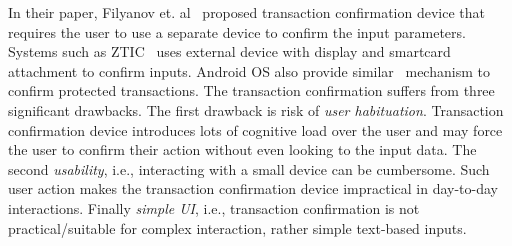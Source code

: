  In their paper, Filyanov et. al~\cite{filyanov2011uni} proposed transaction confirmation device that requires the user to use a separate device to confirm the input parameters. Systems such as ZTIC~\cite{weigold2011secure} uses external device with display and smartcard attachment to confirm inputs. Android OS also provide similar~\cite{android_confirm} mechanism to confirm protected transactions. The transaction confirmation suffers from three significant drawbacks. The first drawback is risk of \emph{user habituation}. Transaction confirmation device introduces lots of cognitive load over the user and may force the user to confirm their action without even looking to the input data. The second \emph{usability}, i.e., interacting with a small device can be cumbersome. Such user action makes the transaction confirmation device impractical in day-to-day interactions. Finally \emph{simple UI}, i.e., transaction confirmation is not practical/suitable for complex interaction, rather simple text-based inputs. 


\relatedWorkTree

